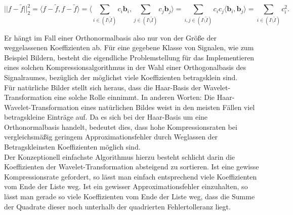 \documentclass{article}
\begin{document}
\[
||f-\tilde{f}||_2^2 
= \langle f-\tilde{f}, f-\tilde{f} \rangle 
= \langle \sum_{i \in (I \setminus \tilde{I})} c_i \mathbf{b}_i , \sum_{j \in (I \setminus \tilde{I})} c_j \mathbf{b}_j \rangle 
= \sum_{i,j \in (I \setminus \tilde{I})} c_i c_j \langle \mathbf{b}_i , \mathbf{b}_j \rangle 
= \sum_{i \in (I \setminus \tilde{I})} c_i^2
.
\]

\noindent Er hängt im Fall einer Orthonormalbasis also nur von der Größe der weggelassenen Koeffizienten ab. Für eine gegebene Klasse von Signalen, wie zum Beispiel Bildern, besteht die eigendliche Problemstellung für das Implementieren eines solchen Kompressionsalgorithmus in der Wahl einer Orthogonalbasis des Signalraumes, bezüglich der möglichst viele Koeffizienten betragsklein sind.\\
Für natürliche Bilder stellt sich heraus, dass die Haar-Basis der Wavelet-Transformation eine solche Rolle einnimmt. In anderen Worten: Die Haar-Wavelet-Transformation eines natürlichen Bildes weist in den meisten Fällen viel betragskleine Einträge auf. Da es sich bei der Haar-Basis um eine Orthonormalbasis handelt, bedeutet dies, dass hohe Kompressionsraten bei vergleichsmäßig geringem Approximationsfehler durch Weglassen der Betragskleinsten Koeffizienten möglich sind. \\
Der Konzeptionell einfachste Algorithmus hierzu besteht schlicht darin die Koeffizienten der Wavelet-Transformation absteigend zu sortieren. Ist eine gewisse Kompressionsrate gefordert, so lässt man einfach entsprechend viele Koeffizienten vom Ende der Liste weg. Ist ein gewisser Approximationsfehler einzuhalten, so lässt man gerade so viele Koeffizienten vom Ende der Liste weg, dass die Summe der Quadrate dieser noch unterhalb der quadrierten Fehlertolleranz liegt.





\end{document}
